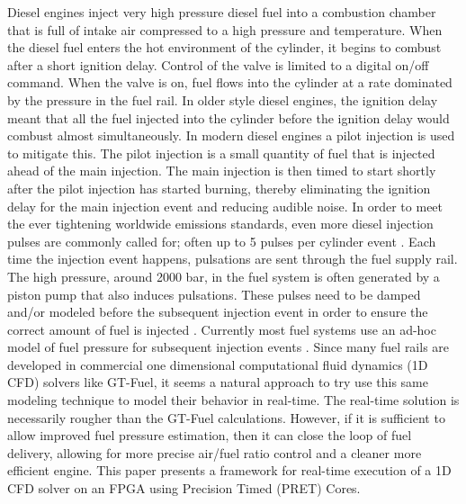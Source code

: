 	Diesel engines inject very high pressure diesel fuel into a combustion chamber that is full of intake air compressed to a high pressure and temperature.  
        When the diesel fuel enters the hot environment of the cylinder, it begins to combust after a short ignition delay.  Control of the valve is limited to a digital on/off command.  
        When the valve is on, fuel flows into the cylinder at a rate dominated by the pressure in the fuel rail.  
        In older style diesel engines, the ignition delay meant that all the fuel injected into the cylinder before the ignition delay would combust almost simultaneously.  
        In modern diesel engines a pilot injection is used to mitigate this.  
        The pilot injection is a small quantity of fuel that is injected ahead of the main injection.  
        The main injection is then timed to start shortly after the pilot injection has started burning, thereby eliminating the ignition delay for the main injection event and reducing audible noise.  
        In order to meet the ever tightening worldwide emissions standards, even more diesel injection pulses are commonly called for; often up to 5 pulses per cylinder event \cite{DIManual}.
	Each time the injection event happens, pulsations are sent through the fuel supply rail.  
        The high pressure, around 2000 bar, in the fuel system is often generated by a piston pump that also induces pulsations.  
        These pulses need to be damped and/or modeled before the subsequent injection event in order to ensure the correct amount of fuel is injected \cite{BoschDiesel}. 
        Currently most fuel systems use an ad-hoc model of fuel pressure for subsequent injection events \cite{Winward01082010}.
	Since many fuel rails are developed in commercial one dimensional computational fluid dynamics (1D CFD) solvers like GT-Fuel, it seems a natural approach to try use this same modeling technique to model their behavior in real-time.
        The real-time solution is necessarily rougher than the GT-Fuel calculations.
        However, if it is sufficient to allow improved fuel pressure estimation, then it can close the loop of fuel delivery, allowing for more precise air/fuel ratio control and a cleaner more efficient engine.
	This paper presents a framework for real-time execution of a 1D CFD solver on an FPGA using Precision Timed (PRET) Cores.
	  
